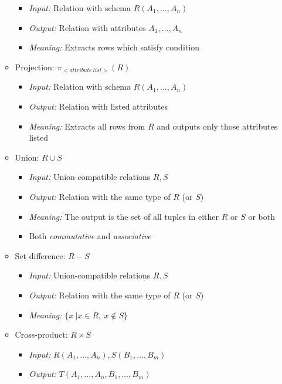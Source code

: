 \documentclass[landscape,8pt]{extarticle}
\begin{document}
\begin{multicols}{4}
\begin{itemize}
\begin{itemize}
        \begin{itemize}
            \item \emph{Input:} Relation with schema $R(A_1, \dots, A_n)$
            \item \emph{Output:} Relation with attributes $A_1, \dots, A_n$
            \item \emph{Meaning:} Extracts rows which satisfy condition
        \end{itemize}
        \item Projection: $\pi_{<attribute\ list>}(R)$
        \begin{itemize}
            \item \emph{Input:} Relation with schema $R(A_1, \dots, A_n)$
            \item \emph{Output:} Relation with listed attributes
            \item \emph{Meaning:} Extracts all rows from $R$ and outputs only those attributes listed
        \end{itemize}
            \item Union: $R \cup S$
            \begin{itemize}
                \item \emph{Input:} Union-compatible relations $R,S$
                \item \emph{Output:} Relation with the same type of $R$ (or $S$)
                \item \emph{Meaning:} The output is the set of all tuples in either $R$ or $S$ or
                both
                \item Both \emph{commutative} and \emph{associative}
            \end{itemize}
            \item Set difference: $R - S$
            \begin{itemize}
                \item \emph{Input:} Union-compatible relations $R,S$
                \item \emph{Output:} Relation with the same type of $R$ (or $S$)
                \item \emph{Meaning:} $\{x\ | x \in R,\ x \notin S\}$
            \end{itemize}
            \item Cross-product: $R \times S$
            \begin{itemize}
                \item \emph{Input:} $R(A_1, \dots, A_n), S(B_1, \dots, B_m)$
                \item \emph{Output:} $T(A_1, \dots, A_n, B_1, \dots, B_m)$

\end{itemize}
\end{itemize}
\end{itemize}
\end{multicols}
\end{document}
